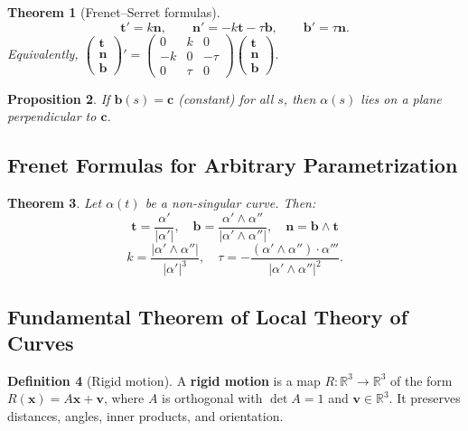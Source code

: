 \documentclass[10pt, a4paper]{article}
\theoremstyle{plain}
\newtheorem{theorem}{Theorem}[section]
\newtheorem{proposition}[theorem]{Proposition}
\theoremstyle{definition}
\newtheorem{definition}[theorem]{Definition}
\theoremstyle{remark}
\begin{document}
\begin{theorem}[Frenet--Serret formulas]
  \[
    \mathbf{t}'=k\mathbf{n},\qquad
    \mathbf{n}'=-k\mathbf{t}-\tau\mathbf{b},\qquad
    \mathbf{b}'=\tau\mathbf{n}.
  \]
  Equivalently,
  $\begin{pmatrix}\mathbf{t}\\\mathbf{n}\\\mathbf{b}\end{pmatrix}'
  =\begin{pmatrix}0&k&0\\-k&0&-\tau\\0&\tau&0\end{pmatrix}
  \begin{pmatrix}\mathbf{t}\\\mathbf{n}\\\mathbf{b}\end{pmatrix}.$
\end{theorem}

\begin{proposition}
  If $\mathbf{b}(s)=\mathbf{c}$ (constant) for all $s$, then $\alpha(s)$ lies on a plane perpendicular to $\mathbf{c}$.
\end{proposition}

\subsection{Frenet Formulas for Arbitrary Parametrization}

\begin{theorem}
  Let $\alpha(t)$ be a non-singular curve. Then:
  \[
    \mathbf{t}=\frac{\alpha'}{|\alpha'|},\quad
    \mathbf{b}=\frac{\alpha'\wedge\alpha''}{|\alpha'\wedge\alpha''|},\quad
    \mathbf{n}=\mathbf{b}\wedge\mathbf{t}
  \]
  \[
    k=\frac{|\alpha'\wedge\alpha''|}{|\alpha'|^3},\quad
    \tau=-\frac{(\alpha'\wedge\alpha'')\cdot\alpha'''}{|\alpha'\wedge\alpha''|^2}.
  \]
\end{theorem}

\subsection{Fundamental Theorem of Local Theory of Curves}

\begin{definition}[Rigid motion]
  A \textbf{rigid motion} is a map $R:\mathbb{R}^3\to\mathbb{R}^3$ of the form $R(\mathbf{x})=A\mathbf{x}+\mathbf{v}$, where $A$ is orthogonal with $\det A=1$ and $\mathbf{v}\in\mathbb{R}^3$. It preserves distances, angles, inner products, and orientation.
\end{definition}
\end{document}
